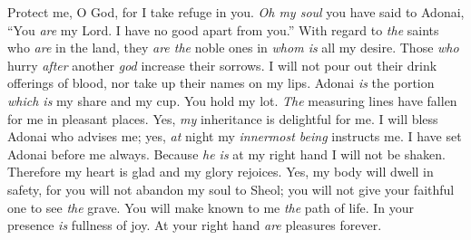 \begin{biblechapter} %
 Protect me, O God, 
for I take refuge in you.
\verse \textit{Oh my soul} you have said to Adonai, “You \textit{are} my Lord. 
I have no good apart from you.”
\verse With regard to \textit{the} saints who \textit{are} in the land, 
they \textit{are the} noble ones in \textit{whom is} all my desire.
\verse Those \textit{who} hurry \textit{after} another \textit{god} increase their sorrows. 
I will not pour out their drink offerings of blood, 
nor take up their names on my lips.
\verse Adonai \textit{is} the portion \textit{which is} my share and my cup. 
You hold my lot.
\verse \textit{The} measuring lines have fallen for me in pleasant places. 
Yes, \textit{my} inheritance is delightful for me.
\verse I will bless Adonai who advises me; 
yes, \textit{at} night my \textit{innermost being} instructs me.
\verse I have set Adonai before me always. 
Because \textit{he is} at my right hand I will not be shaken.
\verse Therefore my heart is glad and my glory rejoices. 
Yes, my body will dwell in safety,
\verse for you will not abandon my soul to Sheol; 
you will not give your faithful one to see \textit{the} grave.
\verse You will make known to me \textit{the} path of life. 
In your presence \textit{is} fullness of joy. 
At your right hand \textit{are} pleasures forever.
\end{biblechapter}

